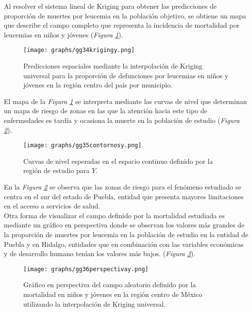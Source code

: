 \documentclass[11pt, oneside]{book}
\begin{document}
Al resolver el sistema lineal de Kriging para obtener las predicciones de proporción de muertes por leucemia en la población objetivo, se obtiene un mapa que describe el campo completo que representa la incidencia de mortalidad por leucemias en niños y jóvenes (\emph{Figura \ref{rastery}}). 

\begin{figure}[!ht]
    \centering
    \texttt{[image: graphs/gg34krigingy.png]}
  \caption{Predicciones espaciales mediante la interpolación de Kriging universal para la proporción de defunciones por leucemias en niños y jóvenes en la región centro del país por municipio.}
  \label{rastery}
\end{figure}


El mapa de la \emph{Figura \ref{rastery}} se interpreta mediante las curvas de nivel que determinan un mapa de riesgo de zonas en las que la atención hacia este tipo de enfermedades es tardía y ocasiona la muerte en la población de estudio (\emph{Figura \ref{curvasy}}).\\

\begin{figure}[!ht]
    \centering
    \texttt{[image: graphs/gg35contornosy.png]}
  \caption{Curvas de nivel esperadas en el espacio continuo definido por la región de estudio para $Y$.}
  \label{curvasy}
\end{figure}

En la \emph{Figura \ref{curvasy}} se observa que las zonas de riesgo para el fenómeno estudiado se centra en el sur del estado de Puebla, entidad que presenta mayores limitaciones en el acceso a servicios de salud.\\

Otra forma de visualizar el campo definido por la mortalidad estudiada es mediante un gráfico en perspectiva donde se observan los valores más grandes de la proporción de muertes por leucemia en la población de estudio en la entidad de Puebla y en Hidalgo, entidades que en combinación con las variables económicas y de desarrollo humano tenían los valores más bajos. (\emph{Figura \ref{perspy}}).

\begin{figure}[ht]
    \centering
    \texttt{[image: graphs/gg36perspectivay.png]}
  \caption{Gráfico en perspectiva del campo aleatorio definido por la mortalidad en niños y jóvenes en la región centro de México utilizando la interpolación de Kriging universal.}
  \label{perspy}
\end{figure}
\end{document}
